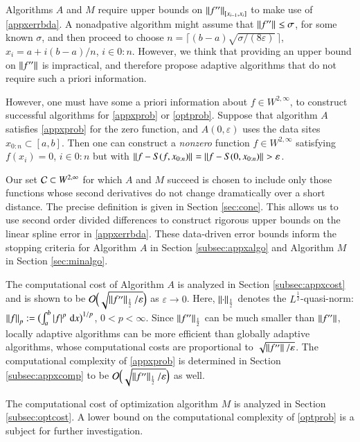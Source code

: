 \documentclass[review]{elsarticle}
\newcommand{\abstol}{\varepsilon}
\newcommand{\zton}{0\!:\!n}
\newcommand{\datasites}{x_{0:n}}
\theoremstyle{definition}
\renewcommand{\cw}{W}
\begin{document}
Algorithms $A$ and $M$ require upper bounds on $\norm[{[x_{i-1},x_i]}]{f''}$ to make use of \eqref{appxerrbda}.  A nonadpative algorithm might assume that $\norm{f''} \le \sigma$, for some known $\sigma$, and then proceed to choose $n = \bigl \lceil (b-a)\sqrt{\sigma/(8 \varepsilon)} \, \bigr \rceil$, $x_i = a + i(b-a)/n$, $i \in 0\!:\!n$.  However, we think that providing an upper bound on  $\norm{f''}$ is impractical, and therefore propose adaptive algorithms that do not require such a priori information.

However, one must have some a priori information about $f \in \cw^{2,\infty} $, to construct successful algorithms for \eqref{appxprob} or \eqref{optprob}.  Suppose that algorithm $A$ satisfies \eqref{appxprob} for the zero function, and $A(0,\varepsilon)$ uses the data sites $x_{0:n}\subset [a,b]$.  Then one can construct a \emph{nonzero} function $f \in \cw^{2,\infty}$ satisfying $f(x_i) = 0$, $i\in \zton$ but with $\norm{f - S(f,\datasites)} = \norm{f - S(0,\datasites)} > \varepsilon$.

Our set $\cc \subset \cw^{2,\infty}$ for which $A$ and $M$ succeed is chosen to include only those functions whose second derivatives do not change dramatically over a short distance.  The precise definition is given in Section \ref{sec:cone}.  This allows us  to use second order divided differences to construct rigorous upper bounds on the linear spline error in  \eqref{appxerrbda}.  These data-driven error bounds inform the stopping criteria for Algorithm $A$ in Section \ref{subsec:appxalgo} and Algorithm $M$ in Section \ref{sec:minalgo}.

The computational cost of Algorithm $A$ is analyzed in Section \ref{subsec:appxcost} and is shown to be $\Order\Bigl(\sqrt{\norm[\frac12]{f''}/\abstol}\Bigr)$ as $\abstol \to  0$.   Here, $\norm[\frac12]{\cdot}$ denotes the
$L^{\frac12}$-quasi-norm: $\norm[p]{f} := \bigl(\int_a^b \abs{f}^p \, \dif x
\bigr)^{1/p}$, $0 < p < \infty$. Since $\norm[\frac12]{f''}$ can be much smaller than $\norm{f''}$, locally adaptive algorithms can be more efficient than globally
adaptive algorithms, whose computational costs are proportional to
$\sqrt{\norm{f''}/\abstol}$.  The computational complexity of \eqref{appxprob} is determined in Section \ref{subsec:appxcomp} to be $\Order\Bigl(\sqrt{\norm[\frac12]{f''}/\abstol}\Bigr)$ as well.

The computational cost of optimization algorithm $M$ is analyzed in Section \ref{subsec:optcost}.  A lower bound on the computational complexity of \eqref{optprob} is a subject for further investigation.
\end{document}
